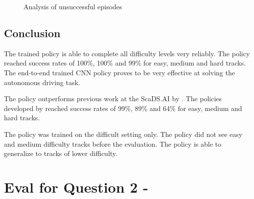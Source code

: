 \begin{figure}
    \centering
    \caption{Analysis of unsuccessful episodes}
    \label{fig:unsuccessful_episodes}
\end{figure}



\subsection{Conclusion}

The trained policy is able to complete all difficulty levels very reliably. The policy reached success rates of 100\%, 100\% and 99\% for easy, medium and hard tracks. The end-to-end trained \ac{CNN} policy proves to be very effective at solving the autonomous driving task.

The policy outperforms previous work at the ScaDS.AI by \textcite{maximilian}. The policies developed by \textcite{maximilian} reached success rates of 99\%, 89\% and 64\% for easy, medium and hard tracks.

The policy was trained on the difficult setting only. The policy did not see easy and medium difficulty tracks before the evaluation. The policy is able to generalize to tracks of lower difficulty.

\section{Eval for Question 2 - \questionTwo}

